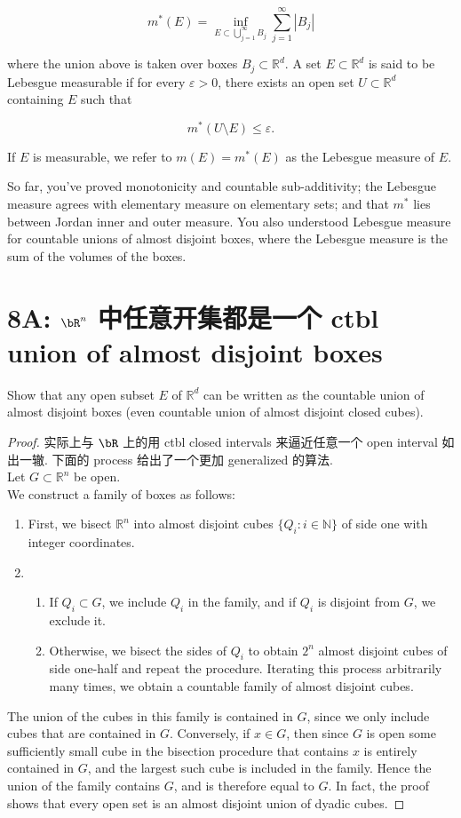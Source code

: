 \documentclass[lang=cn,11pt]{template}
\begin{document}
\[
m^*(E) = \inf_{E \subset \bigcup_{j=1}^{\infty} B_j} \sum_{j=1}^{\infty} |B_j|
\]

where the union above is taken over boxes $B_j \subset \mathbb{R}^d$. A set $E \subset \mathbb{R}^d$ is said to be Lebesgue measurable if for every $\varepsilon > 0$, there exists an open set $U \subset \mathbb{R}^d$ containing $E$ such that 

\[
m^*(U \setminus E) \leq \varepsilon.
\]

If $E$ is measurable, we refer to $m(E) = m^*(E)$ as the Lebesgue measure of $E$.

So far, you've proved monotonicity and countable sub-additivity; the Lebesgue measure agrees with elementary measure on elementary sets; and that $m^*$ lies between Jordan inner and outer measure. You also understood Lebesgue measure for countable unions of almost disjoint boxes, where the Lebesgue measure is the sum of the volumes of the boxes.

\section*{8A: $\bR^n$ 中任意开集都是一个 ctbl union of almost disjoint boxes}

Show that any open subset $E$ of $\mathbb{R}^d$ can be written as the countable union of almost disjoint boxes (even countable union of almost disjoint closed cubes).


\begin{proof}
实际上与 $\bR$ 上的用 ctbl closed intervals 来逼近任意一个 open interval 如出一辙. 下面的 process 给出了一个更加 generalized 的算法.\\
Let $G \subset \mathbb{R}^n$ be open. \\
We construct a family of boxes as follows: 
\begin{enumerate}
    \item  First, we bisect $\mathbb{R}^n$ into almost disjoint cubes $\{Q_i : i \in \mathbb{N}\}$ of side one with integer coordinates.
    \item \begin{enumerate}
        \item If $Q_i \subset G$, we include $Q_i$ in the family, and if $Q_i$ is disjoint from $G$, we exclude it.
        \item Otherwise, we bisect the sides of $Q_i$ to obtain $2^n$ almost disjoint cubes of side one-half and repeat the procedure. Iterating this process arbitrarily many times, we obtain a countable family of almost disjoint cubes.
    \end{enumerate}
\end{enumerate}
The union of the cubes in this family is contained in $G$, since we only include cubes that are contained in $G$. Conversely, if $x \in G$, then since $G$ is open some sufficiently small cube in the bisection procedure that contains $x$ is entirely contained in $G$, and the largest such cube is included in the family. Hence the union of the family contains $G$, and is therefore equal to $G$.
In fact, the proof shows that every open set is an almost disjoint union of dyadic cubes.
\end{proof}
\end{document}
